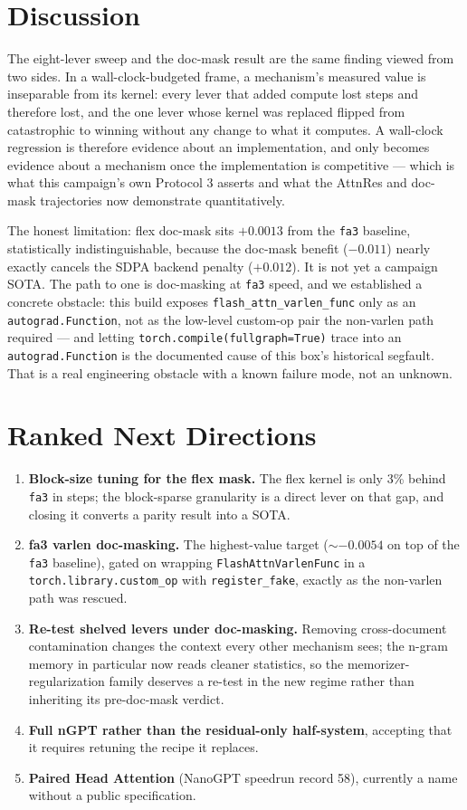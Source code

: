 \documentclass{article}
\begin{document}
\section{Discussion}
The eight-lever sweep and the doc-mask result are the same finding viewed from two sides. In a wall-clock-budgeted frame, a mechanism's measured value is inseparable from its kernel: every lever that added compute lost steps and therefore lost, and the one lever whose kernel was replaced flipped from catastrophic to winning without any change to what it computes. A wall-clock regression is therefore evidence about an implementation, and only becomes evidence about a mechanism once the implementation is competitive --- which is what this campaign's own Protocol 3 asserts and what the AttnRes and doc-mask trajectories now demonstrate quantitatively.

The honest limitation: flex doc-mask sits $+0.0013$ from the \texttt{fa3} baseline, statistically indistinguishable, because the doc-mask benefit ($-0.011$) nearly exactly cancels the SDPA backend penalty ($+0.012$). It is not yet a campaign SOTA. The path to one is doc-masking at \texttt{fa3} speed, and we established a concrete obstacle: this build exposes \texttt{flash\_attn\_varlen\_func} only as an \texttt{autograd.Function}, not as the low-level custom-op pair the non-varlen path required --- and letting \texttt{torch.compile(fullgraph=True)} trace into an \texttt{autograd.Function} is the documented cause of this box's historical segfault. That is a real engineering obstacle with a known failure mode, not an unknown.

\section{Ranked Next Directions}
\begin{enumerate}
\item \textbf{Block-size tuning for the flex mask.} The flex kernel is only 3\% behind \texttt{fa3} in steps; the block-sparse granularity is a direct lever on that gap, and closing it converts a parity result into a SOTA.
\item \textbf{fa3 varlen doc-masking.} The highest-value target ($\sim -0.0054$ on top of the \texttt{fa3} baseline), gated on wrapping \texttt{FlashAttnVarlenFunc} in a \texttt{torch.library.custom\_op} with \texttt{register\_fake}, exactly as the non-varlen path was rescued.
\item \textbf{Re-test shelved levers under doc-masking.} Removing cross-document contamination changes the context every other mechanism sees; the n-gram memory in particular now reads cleaner statistics, so the memorizer-regularization family deserves a re-test in the new regime rather than inheriting its pre-doc-mask verdict.
\item \textbf{Full nGPT rather than the residual-only half-system}, accepting that it requires retuning the recipe it replaces.
\item \textbf{Paired Head Attention} (NanoGPT speedrun record 58), currently a name without a public specification.
\end{enumerate}
\end{document}
